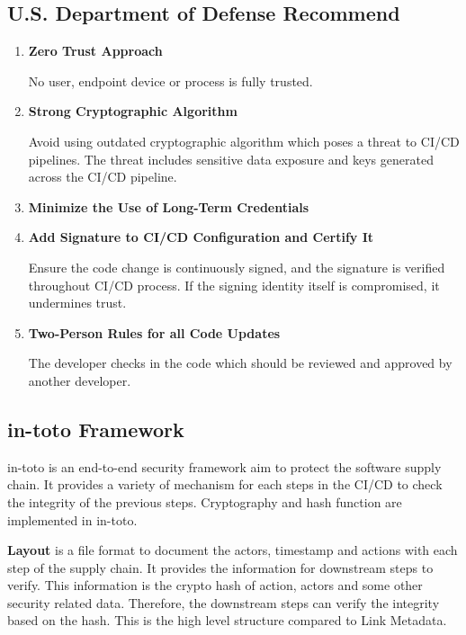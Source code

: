 \subsection{ U.S. Department of Defense Recommend \cite{DoDDefCI/CD2023}}
\begin{enumerate}
    \item \textbf{Zero Trust Approach}
    
        No user, endpoint device or process is fully trusted.

    \item \textbf{Strong Cryptographic Algorithm}
    
        Avoid using outdated cryptographic algorithm which poses a threat to CI/CD pipelines.
        The threat includes sensitive data exposure and keys generated across the CI/CD 
        pipeline.

    \item \textbf{Minimize the Use of Long-Term Credentials}

    \item \textbf{Add Signature to CI/CD Configuration and Certify It}

        Ensure the code change is continuously signed, and the signature is verified throughout
        CI/CD process. If the signing identity itself is compromised, it undermines trust.
    
    \item \textbf{Two-Person Rules for all Code Updates}

        The developer checks in the code which should be reviewed and approved by another 
        developer. 

\end{enumerate}

\subsection{in-toto Framework}
in-toto is an end-to-end security framework aim to protect the software supply chain. It provides a variety
of mechanism for each steps in the CI/CD to check the integrity of the previous steps. Cryptography and hash 
function are implemented in in-toto.

\textbf{Layout} is a file format to document the actors, timestamp and actions with each step of the supply chain.
It provides the information for downstream steps to verify. This information is the crypto hash of action, actors and some other security
related data. Therefore, the downstream steps can verify the integrity based on the hash. This is the high level structure 
compared to Link Metadata.

